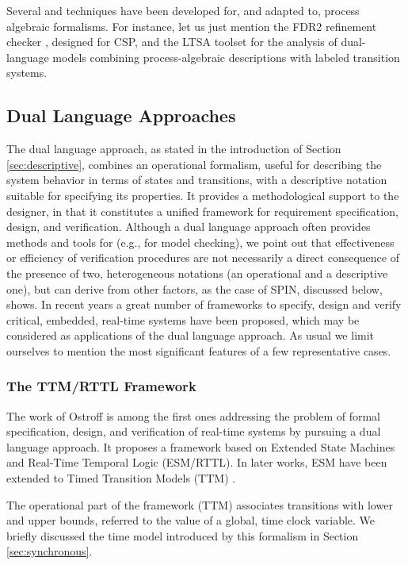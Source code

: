 Several  and  techniques have been developed 
for, and adapted to, process algebraic formalisms. For instance, 
let us just mention the FDR2 refinement checker \cite{Ros97}, designed 
for CSP, and the LTSA toolset \cite{MK99} for the analysis of dual-language 
models combining process-algebraic descriptions with labeled 
transition systems.



\subsection{Dual Language Approaches} \label{sec:duallanguage}
The dual language approach, as stated in the introduction 
of Section \ref{sec:descriptive}, combines an operational formalism, useful for 
describing the system behavior in terms of states and transitions, 
with a descriptive notation suitable for specifying its properties. 
It provides a methodological support to the designer, in that 
it constitutes a unified framework for requirement specification, 
design, and verification. Although a dual language approach often 
provides methods and tools for  (e.g., for model 
checking), we point out that effectiveness or efficiency of verification 
procedures are not necessarily a direct consequence of the presence 
of two, heterogeneous notations (an operational and a descriptive 
one), but can derive from other factors, as the case of SPIN, 
discussed below, shows. In recent years a great number of frameworks 
to specify, design and verify critical, embedded, real-time systems 
have been proposed, which may be considered as applications of 
the dual language approach. As usual we limit ourselves to mention 
the most significant features of a few representative cases.


\subsubsection*{The TTM/RTTL Framework}
The work of Ostroff \cite{Ost89} is among the first ones addressing 
the problem of formal specification, design, and verification 
of real-time systems by pursuing a dual language approach. It 
proposes a framework based on Extended State Machines and Real-Time 
Temporal Logic (ESM/RTTL). In later works, ESM have been extended 
to Timed Transition Models (TTM) \cite{Ost90,Ost99}.

The operational part of the framework (TTM) associates transitions 
with lower and upper bounds, referred to the value of a global, 
 time clock variable. We briefly discussed the time model 
introduced by this formalism in Section \ref{sec:synchronous}.


